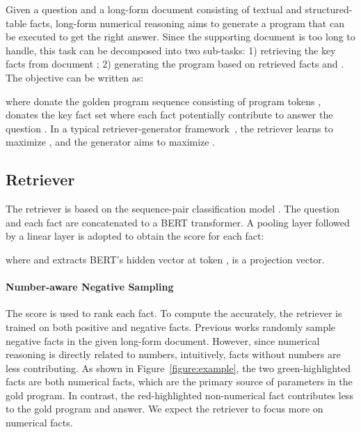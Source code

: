 \documentclass[11pt]{article}
\begin{document}
Given a question  and a long-form document  consisting of textual and structured-table facts, long-form numerical reasoning aims to generate a program that can be executed to get the right answer. Since the supporting document is too long to handle, this task can be decomposed into two sub-tasks: 1) retrieving the key facts from document ; 2) generating the program based on retrieved facts and . The objective can be written as:

where  donate the golden program sequence consisting of  program tokens ,  donates the key fact set where each fact  potentially contribute to answer the question . 
In a typical retriever-generator framework~\cite{chen2021finqa}, the retriever learns to maximize , and the generator aims to  maximize . 











\subsection{Retriever}
\label{sec:retriever}


The retriever is based on the sequence-pair classification model \citet{nogueira2019passage}. The question  and each fact  are concatenated to a BERT \cite{bert} transformer. A pooling layer followed by a linear layer is adopted to obtain the score  for each fact:

where  and  extracts BERT’s hidden vector at token ,  is a projection vector.
\paragraph{Number-aware Negative Sampling}
The score  is used to rank each fact. To compute the  accurately, the retriever is trained on both positive and negative facts. Previous works \cite{chen2021finqa,convfinqa,wang2022numerical} randomly sample negative facts in the given long-form document. However, since numerical reasoning is directly related to numbers, intuitively, facts without numbers are less contributing. As shown in Figure~\ref{figure:example}, the two green-highlighted facts are both numerical facts, which are the primary source of parameters in the gold program. In contrast, the red-highlighted non-numerical fact contributes less to the gold program and answer. We expect the retriever to focus more on numerical facts. 
\end{document}
